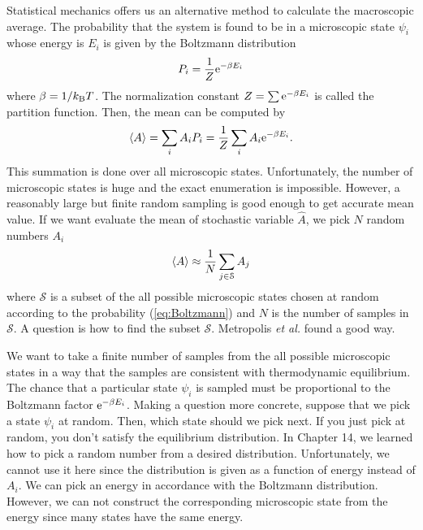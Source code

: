 Statistical mechanics offers us an alternative method to calculate the macroscopic average.  The probability that the system is found to be in a microscopic state $\psi_i$ whose energy is $E_i$ is given by the Boltzmann distribution
\begin{equation}\label{eq:Boltzmann}
P_i = \frac{1}{Z} \text{e}^{-\beta E_i}
\end{equation}
where $\beta=1/k_\text{B} T$.  The normalization constant $Z=\sum \text{e}^{-\beta E_i}$ is called the partition function.  Then, the mean can be computed by
\begin{equation}
\langle A \rangle = \sum_i A_i P_i = \frac{1}{Z}\sum_i A_i \text{e}^{-\beta E_i}.
\end{equation}
This summation is done over  all microscopic states.  Unfortunately, the number of microscopic states is huge and the exact enumeration is impossible.  However, a reasonably large but finite random sampling is good enough to get accurate mean value.  If we want evaluate
the mean of stochastic variable $\hat{A}$, we pick $N$ random numbers $A_i$
\begin{equation}
\langle A \rangle \approx \frac{1}{N} \sum_{j \in \mathcal{S}} A_j
\end{equation}
where $\mathcal{S}$ is a subset of the all possible microscopic states chosen at random according to the probability (\ref{eq:Boltzmann}) and $N$ is the number of samples in $\mathcal{S}$.  A question is how to find the subset $\mathcal{S}$.
Metropolis \textit{et al.}\cite{metropolis1953} found a good way.

We want to take a finite number of samples from the all possible microscopic states in a way that the samples are consistent with thermodynamic equilibrium.  The chance that a particular state $\psi_i$ is sampled must be proportional to the Boltzmann factor $\text{e}^{-\beta E_i}$.
Making a question more concrete, suppose that we pick a state $\psi_i$ at random.  Then, which state should we pick next.  If you just pick at random, you don't satisfy the equilibrium distribution.  In Chapter 14, we learned how to pick a random number from a desired distribution.  Unfortunately, we cannot use it here since the distribution is given as a function of energy instead of $A_i$.  We can pick an energy in accordance with the Boltzmann distribution.  However, we can not construct the corresponding microscopic state from the energy since many states have the same energy.

